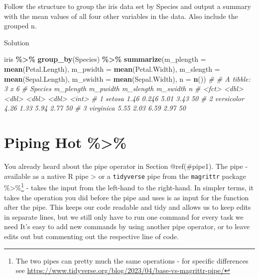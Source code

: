 \documentclass[
]{book}
\newenvironment{Shaded}{\begin{snugshade}}{\end{snugshade}}
\newcommand{\AttributeTok}[1]{\textcolor[rgb]{0.13,0.29,0.53}{#1}}
\newcommand{\CommentTok}[1]{\textcolor[rgb]{0.56,0.35,0.01}{\textit{#1}}}
\newcommand{\FunctionTok}[1]{\textcolor[rgb]{0.13,0.29,0.53}{\textbf{#1}}}
\newcommand{\NormalTok}[1]{#1}
\newcommand{\SpecialCharTok}[1]{\textcolor[rgb]{0.81,0.36,0.00}{\textbf{#1}}}
\begin{document}
Follow the structure to group the iris data set by Species and output a summary with the mean values of all four other variables in the data.
Also include the grouped n.

Solution

\begin{Shaded}
\begin{Highlighting}[]
\NormalTok{iris }\SpecialCharTok{\%\textgreater{}\%} 
  \FunctionTok{group\_by}\NormalTok{(Species) }\SpecialCharTok{\%\textgreater{}\%} 
  \FunctionTok{summarize}\NormalTok{(}\AttributeTok{m\_plength =} \FunctionTok{mean}\NormalTok{(Petal.Length),}
            \AttributeTok{m\_pwidth =} \FunctionTok{mean}\NormalTok{(Petal.Width),}
            \AttributeTok{m\_slength =} \FunctionTok{mean}\NormalTok{(Sepal.Length),}
            \AttributeTok{m\_swidth =} \FunctionTok{mean}\NormalTok{(Sepal.Width),}
            \AttributeTok{n =} \FunctionTok{n}\NormalTok{())}
\CommentTok{\# \# A tibble: 3 x 6}
\CommentTok{\#   Species    m\_plength m\_pwidth m\_slength m\_swidth     n}
\CommentTok{\#   \textless{}fct\textgreater{}          \textless{}dbl\textgreater{}    \textless{}dbl\textgreater{}     \textless{}dbl\textgreater{}    \textless{}dbl\textgreater{} \textless{}int\textgreater{}}
\CommentTok{\# 1 setosa          1.46    0.246      5.01     3.43    50}
\CommentTok{\# 2 versicolor      4.26    1.33       5.94     2.77    50}
\CommentTok{\# 3 virginica       5.55    2.03       6.59     2.97    50}
\end{Highlighting}
\end{Shaded}

\section*{Piping Hot \%\textgreater\%}\label{piping-hot}

You already heard about the pipe operator in Section @ref(\#pipe1).
The pipe - available as a native R pipe \textbar\textgreater{} or a \texttt{tidyverse} pipe from the \texttt{magrittr} package \%\textgreater\%\footnote{The two pipes can pretty much the same operations - for specific differences see \url{https://www.tidyverse.org/blog/2023/04/base-vs-magrittr-pipe/}} - takes the input from the left-hand to the right-hand.
In simpler terms, it takes the operation you did before the pipe and uses is as input for the function after the pipe.
This keeps our code readable and tidy and allows us to keep edits in separate lines, but we still only have to run one command for every task we need
It's easy to add new commands by using another pipe operator, or to leave edits out but commenting out the respective line of code.
\end{document}
